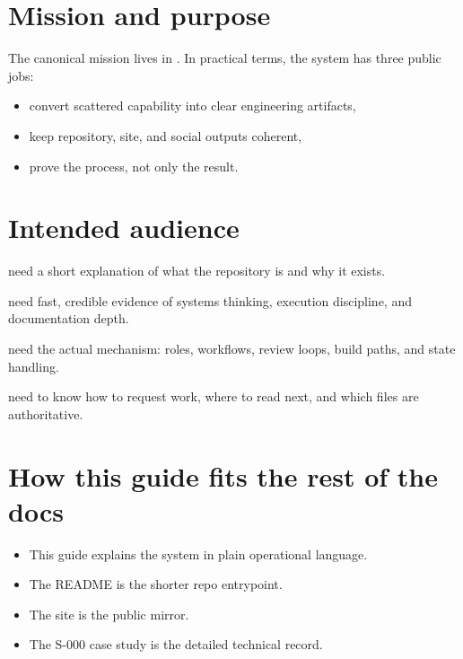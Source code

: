 \documentclass[a4paper,11pt,openany]{report}
\begin{document}

\section{Mission and purpose}

The canonical mission lives in . In practical
terms, the system has three public jobs:

\begin{itemize}
  \item convert scattered capability into clear engineering artifacts,
  \item keep repository, site, and social outputs coherent,
  \item prove the process, not only the result.
\end{itemize}

\section{Intended audience}

\begin{description}[style=nextline]
  \item[Curious readers] need a short explanation of what the repository is and
  why it exists.
  \item[Recruiters and hiring managers] need fast, credible evidence of
  systems thinking, execution discipline, and documentation depth.
  \item[Engineering peers] need the actual mechanism: roles, workflows,
  review loops, build paths, and state handling.
  \item[Operators and contributors] need to know how to request work, where to
  read next, and which files are authoritative.
\end{description}

\section{How this guide fits the rest of the docs}

\begin{itemize}
  \item This guide explains the system in plain operational language.
  \item The README is the shorter repo entrypoint.
  \item The site is the public mirror.
  \item The S-000 case study is the detailed technical record.
\end{itemize}
\end{document}
